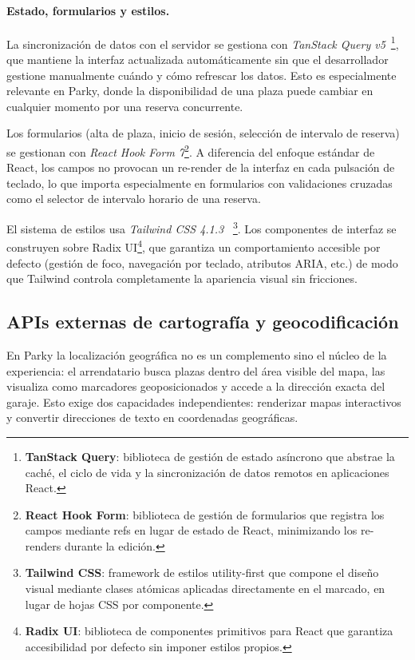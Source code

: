 \paragraph{Estado, formularios y estilos.}
La sincronización de datos con el servidor se gestiona con \textit{TanStack Query v5}~\cite{tanstack_query2024}\footnote{\textbf{TanStack Query}: biblioteca de gestión de estado asíncrono que abstrae la caché, el ciclo de vida y la sincronización de datos remotos en aplicaciones React.}, que mantiene la interfaz actualizada automáticamente sin que el desarrollador gestione manualmente cuándo y cómo refrescar los datos. Esto es especialmente relevante en Parky, donde la disponibilidad de una plaza puede cambiar en cualquier momento por una reserva concurrente.

Los formularios (alta de plaza, inicio de sesión, selección de intervalo de reserva) se gestionan con \textit{React Hook Form 7}\footnote{\textbf{React Hook Form}: biblioteca de gestión de formularios que registra los campos mediante refs en lugar de estado de React, minimizando los re-renders durante la edición.}. A diferencia del enfoque estándar de React, los campos no provocan un re-render de la interfaz en cada pulsación de teclado, lo que importa especialmente en formularios con validaciones cruzadas como el selector de intervalo horario de una reserva.

El sistema de estilos usa \textit{Tailwind CSS 4.1.3}~\cite{tailwindcss2024} \footnote{\textbf{Tailwind CSS}: framework de estilos utility-first que compone el diseño visual mediante clases atómicas aplicadas directamente en el marcado, en lugar de hojas CSS por componente.}. Los componentes de interfaz se construyen sobre Radix UI\footnote{\textbf{Radix UI}: biblioteca de componentes primitivos para React que garantiza accesibilidad por defecto sin imponer estilos propios.}, que garantiza un comportamiento accesible por defecto (gestión de foco, navegación por teclado, atributos ARIA, etc.) de modo que Tailwind controla completamente la apariencia visual sin fricciones.

\subsection{APIs externas de cartografía y geocodificación}
\label{subsec:apis-cartografia}

En Parky la localización geográfica no es un complemento sino el núcleo de la experiencia: el arrendatario busca plazas dentro del área visible del mapa, las visualiza como marcadores geoposicionados y accede a la dirección exacta del garaje. Esto exige dos capacidades independientes: renderizar mapas interactivos y convertir direcciones de texto en coordenadas geográficas.

